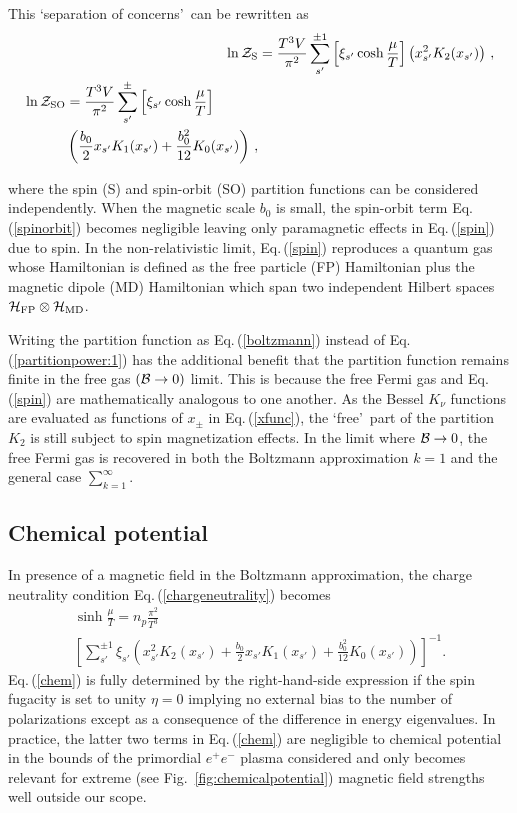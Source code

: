 \documentclass[aps,prd,floatfix,reprint]{revtex4-2}
\newcommand{\req}[1]{Eq.\,(\ref{#1})}
\newcommand{\rf}[1]{Fig.~{\ref{#1}}}
\begin{document}
This \lq separation of concerns\rq\ can be rewritten as
\begin{align}
     \label{spin}
     \ln{\cal Z}_{\rm S}&=\frac{T^{3}V}{\pi^{2}}\sum_{s'}^{\pm1}\left[\xi_{s'}\cosh{\frac{\mu}{T}}\right]\left(x_{s'}^{2}K_{2}(x_{s'})\right)\,,\\
    \begin{split}
        \label{spinorbit}
        \ln{\cal Z}_{\rm SO}&=\frac{T^{3}V}{\pi^{2}}\sum_{s'}^{\pm}\left[\xi_{s'}\cosh{\frac{\mu}{T}}\right]\\
        &\left(\frac{b_{0}}{2}x_{s'}K_{1}(x_{s'})+\frac{b_{0}^{2}}{12}K_{0}(x_{s'})\right)\,,        
    \end{split}
\end{align}

where the spin (S) and spin-orbit (SO) partition functions can be considered independently. When the magnetic scale $b_{0}$ is small, the spin-orbit term \req{spinorbit} becomes negligible leaving only paramagnetic effects in \req{spin} due to spin. In the non-relativistic limit, \req{spin} reproduces a quantum gas whose Hamiltonian is defined as the free particle (FP) Hamiltonian plus the magnetic dipole (MD) Hamiltonian which span two independent Hilbert spaces ${\cal H}_{\rm FP}\otimes{\cal H}_{\rm MD}$.

Writing the partition function as \req{boltzmann} instead of \req{partitionpower:1} has the additional benefit that the partition function remains finite in the free gas $({\cal B}\rightarrow0)$ limit. This is because the free Fermi gas and \req{spin} are mathematically analogous to one another. As the Bessel $K_{\nu}$ functions are evaluated as functions of $x_{\pm}$ in \req{xfunc}, the \lq free\rq\ part of the partition $K_{2}$ is still subject to spin magnetization effects. In the limit where ${\cal B}\rightarrow0$, the free Fermi gas is recovered in both the Boltzmann approximation $k=1$ and the general case $\sum_{k=1}^{\infty}$.

\subsection{Chemical potential}
\label{sec:chem}
\noindent In presence of a magnetic field in the Boltzmann approximation, the charge neutrality condition \req{chargeneutrality} becomes
\begin{multline}
 \label{chem}
 \sinh\frac{\mu}{T}=n_{p}\frac{\pi^{2}}{T^{3}}\\
 \left[\sum_{s'}^{\pm1}\xi_{s'}\!\left(\!x_{s'}^{2}K_{2}(x_{s'})\!+\!\frac{b_{0}}{2}x_{s'}K_{1}(x_{s'})\!+\!\frac{b_{0}^{2}}{12}K_{0}(x_{s'}\!)\!\right)\!\right]^{-1}\!.
\end{multline}
\req{chem} is fully determined by the right-hand-side expression if the spin fugacity is set to unity $\eta=0$ implying no external bias to the number of polarizations except as a consequence of the difference in energy eigenvalues. In practice, the latter two terms in \req{chem} are negligible to chemical potential in the bounds of the primordial $e^{+}e^{-}$ plasma considered and only becomes relevant for extreme (see \rf{fig:chemicalpotential}) magnetic field strengths well outside our scope.
\end{document}
